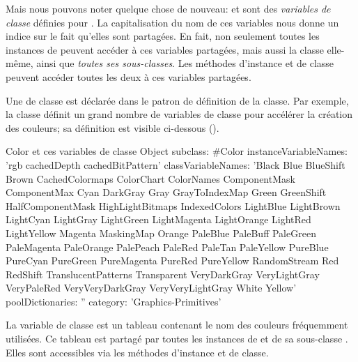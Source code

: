 \documentclass[a4paper,10pt,twoside]{book}
\begin{document}
Mais nous pouvons noter quelque chose de nouveau:  et  sont des \emph{variables de classe} définies pour .
La capitalisation du nom de ces variables nous donne un indice sur le fait qu'elles sont partagées.
En fait, non seulement toutes les instances de  peuvent accéder
à ces variables partagées, mais aussi la classe  elle-même, ainsi que \emph{toutes ses sous-classes}.
Les méthodes d'instance et de classe peuvent accéder toutes les deux
à ces variables partagées.


Une  de classe est déclarée dans le patron de définition de la classe.
Par exemple, la classe  définit un grand nombre de variables de classe pour accélérer la création des couleurs;
sa définition est visible ci-dessous ().

\begin{classdef}[Color]{Color et ces variables de classe}
Object subclass: #Color 	
        instanceVariableNames: 'rgb cachedDepth cachedBitPattern'
        classVariableNames: 'Black Blue BlueShift Brown CachedColormaps ColorChart ColorNames ComponentMask ComponentMax Cyan DarkGray Gray GrayToIndexMap Green GreenShift HalfComponentMask HighLightBitmaps IndexedColors LightBlue LightBrown LightCyan LightGray LightGreen LightMagenta LightOrange LightRed LightYellow Magenta MaskingMap Orange PaleBlue PaleBuff PaleGreen PaleMagenta PaleOrange PalePeach PaleRed PaleTan PaleYellow PureBlue PureCyan PureGreen PureMagenta PureRed PureYellow RandomStream Red RedShift TranslucentPatterns Transparent VeryDarkGray VeryLightGray VeryPaleRed VeryVeryDarkGray VeryVeryLightGray White Yellow'
        poolDictionaries: '' 	
        category: 'Graphics-Primitives'
\end{classdef}

La variable de classe  est un tableau contenant le nom des couleurs fréquemment utilisées. Ce tableau est partagé par toutes les instances de  et de sa sous-classe . 
Elles sont accessibles via les méthodes d'instance et de classe.
\end{document}
